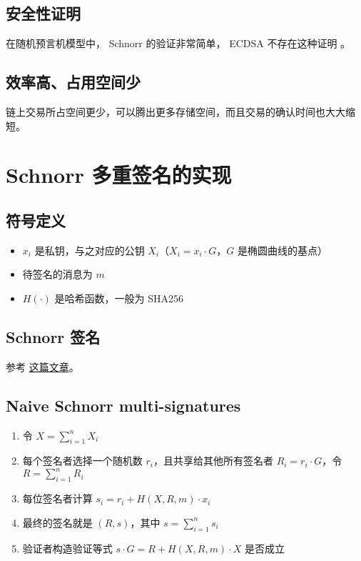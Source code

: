 \documentclass[a4paper,10pt]{article}
\begin{document}
\subsection{安全性证明}

在随机预言机模型中， Schnorr 的验证非常简单， ECDSA 不存在这种证明 \cite{seurin2012exact}。

\subsection{效率高、占用空间少}

链上交易所占空间更少，可以腾出更多存储空间，而且交易的确认时间也大大缩短。

\section{Schnorr 多重签名的实现}
\subsection{符号定义}
\begin{itemize}
  \item \(x_i\) 是私钥，与之对应的公钥 \(X_i\)（\(X_i=x_i\cdot G\)，\(G\) 是椭圆曲线的基点）
  \item 待签名的消息为 \(m\)
  \item \(H(\cdot)\) 是哈希函数，一般为 SHA256
\end{itemize}

\subsection{Schnorr 签名}

参考 \href{https://mp.weixin.qq.com/s/SlbgZ0XbgYIN-DtmDyP7Lg}{这篇文章}。

\subsection{Naive Schnorr multi-signatures}
\begin{enumerate}
  \item 令 \(X=\sum_{i=1}^n X_i\)
  \item 每个签名者选择一个随机数 \(r_i\)，且共享给其他所有签名者 \(R_i=r_i\cdot G\)，令 \(R=\sum_{i=1}^n R_i\)
  \item 每位签名者计算 \(s_i=r_i+H(X,R,m)\cdot x_i\)
  \item 最终的签名就是 \((R,s)\)，其中 \(s=\sum_{i=1}^n s_i\)
  \item 验证者构造验证等式 \(s\cdot G=R+H(X,R,m)\cdot X\) 是否成立
\end{enumerate}
\end{document}
